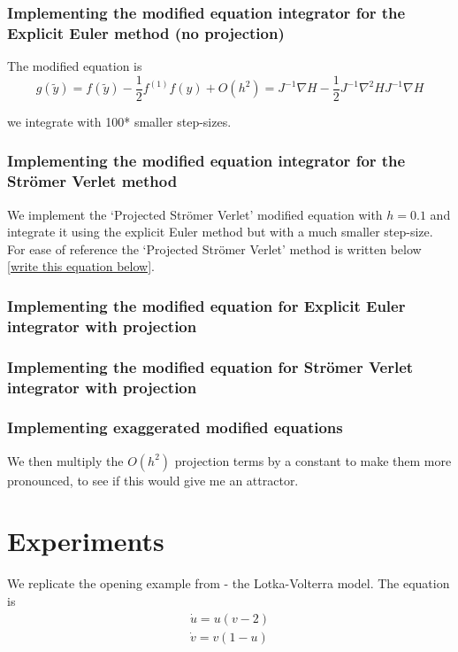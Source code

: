 \documentclass[12pt]{article}
\begin{document}
\subsubsection{Implementing the modified equation integrator for the Explicit Euler method (no projection)}
The modified equation is
$$g(\widetilde y) = f(\widetilde y) - \frac{1}{2}f^{(1)}f(y) + O(h^2) = J^{-1}\nabla H - \frac{1}{2}J^{-1}\nabla^2 H J^{-1}\nabla H$$

we integrate with 100* smaller step-sizes.


\subsubsection{Implementing the modified equation integrator for the Str\"omer Verlet method}
We implement the `Projected Str\"omer Verlet' modified equation with $h=0.1$ and integrate it using the explicit Euler method but with a much smaller step-size. For ease of reference the `Projected Str\"omer Verlet' method is written below \eqref{write this equation below}.

\subsubsection{Implementing the modified equation for Explicit Euler integrator with projection}

\subsubsection{Implementing the modified equation for Str\"omer Verlet integrator with projection}



\subsubsection{Implementing exaggerated modified equations}
We then multiply the $O(h^2)$ projection terms by a constant to make them more pronounced, to see if this would give me an attractor. 





\section{Experiments}
We replicate the opening example from \cite{Numerical} - the Lotka-Volterra model. The equation is 
\begin{equation}\label{eq:Lotka-Volterra}
    \begin{split}
        \dot u = u(v-2)\\
        \dot v = v(1-u)
    \end{split}
\end{equation}
\end{document}
